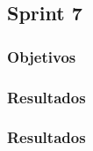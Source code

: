 \subsection{Sprint 7}
\subsubsection{Objetivos}

\subsubsection{Resultados}

\subsubsection{Resultados}



